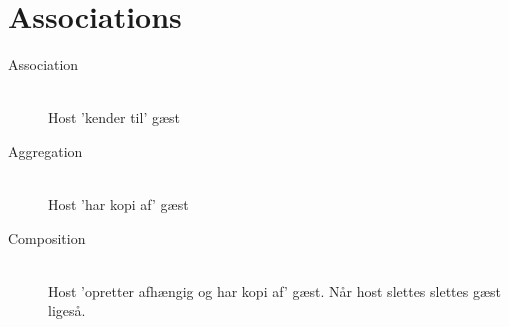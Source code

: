\documentclass{article}
\begin{document}
\section*{Associations}
\begin{description}
\item[Association]~\\
  Host 'kender til' gæst
\item[Aggregation]~\\
  Host 'har kopi af' gæst
\item[Composition]~\\
  Host 'opretter afhængig og har kopi af' gæst. Når host slettes slettes gæst ligeså.
\end{description}

\begin{center}
\end{center}
\end{document}
